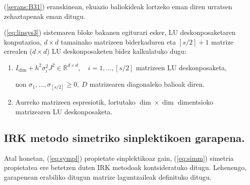 (\ref{serans:B31}) eranskinean, ekuazio baliokideak lortzeko eman diren urratsen zehaztapenak eman ditugu. 

(\ref{eq:linsys3}) sistemaren  bloke bakanen egiturari esker, LU deskonposaketaren konputazioa, $d \times d$ tamainako matrizeen biderkaduren eta $[s/2]+1$ matrize errealen ($d \times d$) LU deskonposaketen bidez kalkulatuko dugu:
\begin{enumerate}
\item $I_\dim + h^2 \sigma_i^2 J^2 \in \mathbb{R}^{d \times d}, \quad i=1,\ldots,[s/2]$ matrizeen LU deskonposaketa,

non $\sigma_1,\ldots,\sigma_{[s/2]} \geq 0 , \ D$ matrizearen diagonaleko balioak diren.
\item Aurreko matrizeen espresiotik, lortutako $\dim \times \dim$ dimentsioko matrizearen LU deskonposaketa.
\end{enumerate} 


\subsection{IRK metodo simetriko sinplektikoen garapena.}
\label{ss:734}

Atal honetan, (\ref{eq:sympl}) propietate sinplektikoaz gain, (\ref{eq:simm}) simetria propietatea  ere betetzen duten IRK metodoak kontsideratuko ditugu. Lehenengo, garapenean erabiliko ditugun matrize laguntzaileak definituko ditugu.

